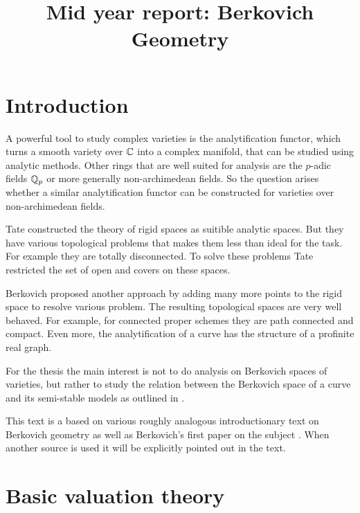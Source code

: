 \documentclass[a4paper]{article}
\title{Mid year report: Berkovich Geometry}
\begin{document}
\maketitle

\tableofcontents

\pagebreak


\todototoc
\listoftodos
\pagebreak


\section{Introduction} \label{sec:introduction}

A powerful tool to study complex varieties is the analytification functor, which turns a  smooth variety over $\mathbb{C}$ into a complex manifold, that can be studied using analytic methods. 
Other rings that are well suited for analysis are the $p$-adic fields $\mathbb{Q}_p$ or more generally non-archimedean fields. 
So the question arises whether a similar analytification functor can be constructed for  varieties over non-archimedean fields. 

Tate constructed the theory of rigid spaces as suitible analytic spaces. 
But they have various topological problems that makes them less than ideal for the task. 
For example they are totally disconnected. To solve these problems Tate restricted the set of open and covers on these spaces. 

Berkovich proposed another approach by adding many more points to the rigid space to resolve various problem. 
The resulting topological spaces are very well behaved. 
For example, for connected proper schemes they are path connected and compact. 
Even more, the analytification of a curve has the structure of a profinite real graph. 

For the thesis the main interest is not to do analysis on Berkovich spaces of varieties, but rather to study the relation between the Berkovich space of a curve and its semi-stable models as outlined in \cite{bakerStructureNonarchimedeanAnalytic2013}.

This text is a based on various roughly analogous introductionary text on Berkovich geometry \cite{bakerarizona,temkinIntroductionBerkovichAnalytic2010,nicaiseNONARCHIMEDEANGEOMETRY,boschLecturesFormalRigid2014} as well as Berkovich's first paper on the subject \cite{berkovichSpectralTheoryAnalytic2012}.
When another source is used it will be explicitly pointed out in the text. 

\section{Basic valuation theory} \label{sec:basic_valuation_theory}
\end{document}
